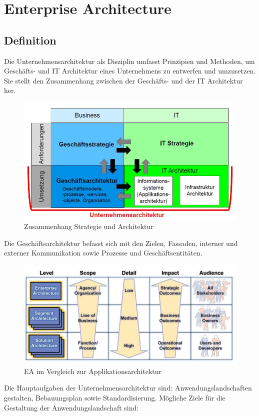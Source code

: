 \chapter{Enterprise Architecture}

\section{Definition}

Die Unternehmensarchitektur als Disziplin umfasst Prinzipien und Methoden, um Geschäfts- und IT Architektur eines Unternehmens zu entwerfen und umzusetzen. Sie stellt den Zusammenhang zwischen der Geschäfts- und der IT Architektur her.

\begin{figure}[h!]
\centering
\includegraphics[width=0.7\linewidth]{fig/unternehmensarchitektur}
\caption{Zusammenhang Strategie und Architektur}
\label{fig:unternehmensarchitektur}
\end{figure}

Die Geschäftsarchitektur befasst sich mit den Zielen, Fassaden, interner und externer Kommunikation sowie Prozesse und Geschäftsentitäten.

\begin{figure}[h!]
\centering
\includegraphics[width=0.7\linewidth]{fig/ea-vs-application}
\caption{EA im Vergleich zur Applikationsarchitektur}
\label{fig:ea-vs-application}
\end{figure}

Die Hauptaufgaben der Unternehmensarchitektur sind: Anwendungslandschaften gestalten, Bebauungsplan sowie Standardisierung. Mögliche Ziele für die Gestaltung der Anwendungslandschaft sind:

